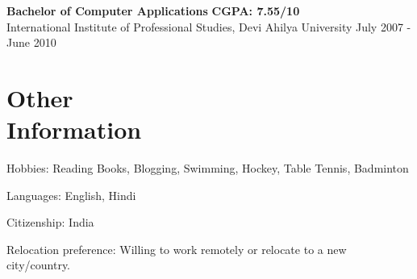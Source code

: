 \documentclass[margin,line]{resume}
\begin{document}
\begin{resume}
	\begin{list2}
	\item \textbf{Bachelor of Computer Applications} \hspace{70mm} \textbf{CGPA: 7.55/10} \\ International Institute of Professional Studies, Devi Ahilya University \hspace{20mm} July 2007 - June 2010
	\end{list2}

    \section{\mysidestyle Other \\ Information}
    \begin{list2}
    \item Hobbies: Reading Books, Blogging, Swimming, Hockey, Table Tennis, Badminton
    \item Languages: English, Hindi
    \item Citizenship: India
    \item Relocation preference: Willing to work remotely or relocate to a new city/country.

     
    \end{list2}



\end{resume}
\end{document}

